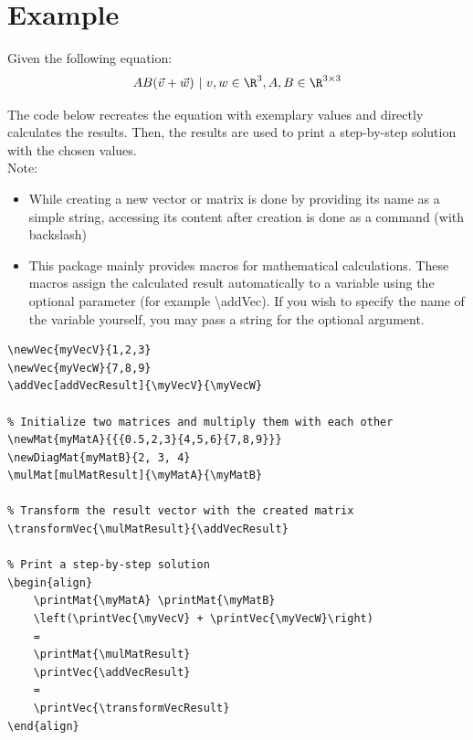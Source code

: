 \section{Example}

Given the following equation:
\[A B (\vec{v} + \vec{w})\ \vert\ v, w \in \R^3, A, B \in \R^{3\times3}\]

The code below recreates the equation with exemplary values and directly calculates the results.
Then, the results are used to print a step-by-step solution with the chosen values.\\
Note:
\begin{itemize}
\setlength\itemsep{0em}
\item While creating a new vector or matrix is done by providing its name as a simple string, accessing its content after creation is done as a command (with backslash)
\item This package mainly provides macros for mathematical calculations. These macros assign the calculated result automatically to a variable using the optional parameter (for example \textbackslash addVec). If you wish to specify the name of the variable yourself, you may pass a string for the optional argument.
\end{itemize}

\lstset{style=latexStyle}
\begin{lstlisting}[gobble=4]
% Initialize two vectors and add them together
\newVec{myVecV}{1,2,3}
\newVec{myVecW}{7,8,9}
\addVec[addVecResult]{\myVecV}{\myVecW}

% Initialize two matrices and multiply them with each other
\newMat{myMatA}{{{0.5,2,3}{4,5,6}{7,8,9}}}
\newDiagMat{myMatB}{2, 3, 4}
\mulMat[mulMatResult]{\myMatA}{\myMatB}

% Transform the result vector with the created matrix
\transformVec{\mulMatResult}{\addVecResult}

% Print a step-by-step solution
\begin{align}
    \printMat{\myMatA} \printMat{\myMatB}
    \left(\printVec{\myVecV} + \printVec{\myVecW}\right)
    =
    \printMat{\mulMatResult}
    \printVec{\addVecResult}
    =
    \printVec{\transformVecResult}
\end{align}
\end{lstlisting}
\vspace{5mm}

